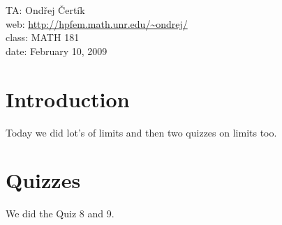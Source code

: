 \documentclass[10pt]{article}
\begin{document}
\noindent TA: Ondřej Čertík\\
web: \url{http://hpfem.math.unr.edu/~ondrej/}\\
class: MATH 181\\
date: February 10, 2009

\section{Introduction}

Today we did lot's of limits and then two quizzes on limits too.

\section{Quizzes}

We did the Quiz 8 and 9.
\end{document}
